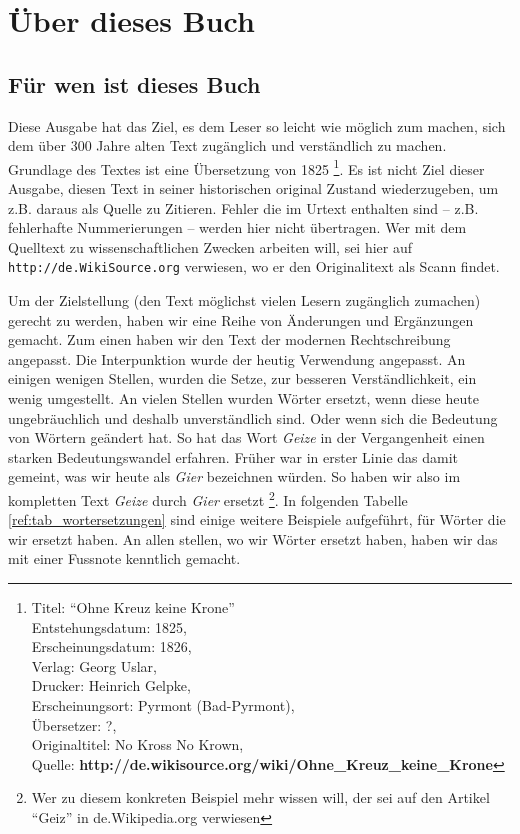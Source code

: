 

\part{Über dieses Buch}


\chapter{Für wen ist dieses Buch}

Diese Ausgabe hat das Ziel, es dem Leser so leicht wie möglich zum machen, sich
dem über 300 Jahre alten Text zugänglich und verständlich zu machen. Grundlage
des Textes ist eine Übersetzung von 1825 \footnote{
Titel: "`Ohne Kreuz keine Krone"' \\
Entstehungsdatum: 1825, \\
Erscheinungsdatum: 1826, \\
Verlag: Georg Uslar, \\
Drucker: Heinrich Gelpke, \\
Erscheinungsort: Pyrmont (Bad-Pyrmont),\\
Übersetzer: ?, \\
Originaltitel: No Kross No Krown, \\
Quelle: \textbf{http://de.wikisource.org/wiki/Ohne\_Kreuz\_keine\_Krone}}. Es
ist nicht Ziel dieser Ausgabe, diesen Text in seiner historischen original
Zustand wiederzugeben, um z.B. daraus als Quelle zu Zitieren. Fehler die im
Urtext enthalten sind -- z.B. fehlerhafte Nummerierungen -- werden hier nicht
übertragen. Wer mit dem Quelltext zu wissenschaftlichen Zwecken arbeiten will,
sei hier auf \texttt{http://de.WikiSource.org} verwiesen, wo er den
Originalitext als Scann findet.

\medskip

Um der Zielstellung (den Text möglichst vielen Lesern zugänglich zumachen)
gerecht zu werden, haben wir eine Reihe von Änderungen und Ergänzungen gemacht.
Zum einen haben wir den Text der modernen Rechtschreibung angepasst. Die
Interpunktion wurde der heutig Verwendung angepasst. An einigen wenigen Stellen,
wurden die Setze, zur besseren Verständlichkeit, ein wenig umgestellt. An vielen
Stellen wurden Wörter ersetzt, wenn diese heute ungebräuchlich und deshalb
unverständlich sind. Oder wenn sich die Bedeutung von Wörtern geändert hat. So
hat das Wort \textit{Geize} in der Vergangenheit einen starken Bedeutungswandel
erfahren. Früher war in erster Linie das damit gemeint, was wir heute als
\textit{Gier} bezeichnen würden. So haben wir also im kompletten Text
\textit{Geize} durch \textit{Gier} ersetzt \footnote{Wer zu diesem konkreten
Beispiel mehr wissen will, der sei auf den Artikel "`Geiz"' in de.Wikipedia.org
verwiesen}. In folgenden Tabelle \ref{ref:tab_wortersetzungen} sind einige
weitere Beispiele aufgeführt, für Wörter die wir ersetzt haben. An allen
stellen, wo wir Wörter ersetzt haben, haben wir das mit einer Fussnote kenntlich
gemacht.

